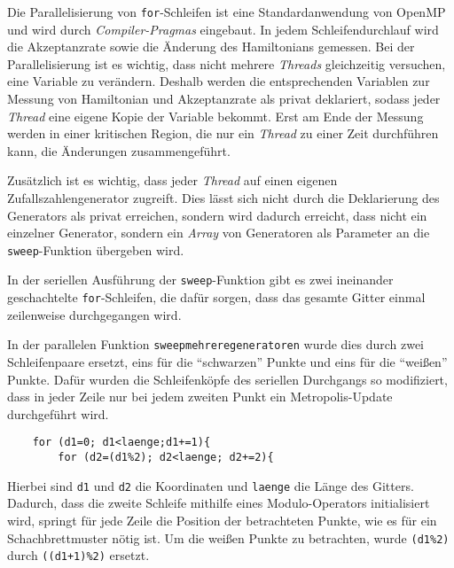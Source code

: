 	Die Parallelisierung von \texttt{for}-Schleifen ist eine Standardanwendung von OpenMP und wird durch \textit{Compiler-Pragmas} eingebaut. In jedem Schleifendurchlauf wird die Akzeptanzrate sowie die Änderung des Hamiltonians gemessen. Bei der Parallelisierung ist es wichtig, dass nicht mehrere \textit{Threads} gleichzeitig versuchen, eine Variable zu verändern. Deshalb werden die entsprechenden Variablen zur Messung von Hamiltonian und Akzeptanzrate als privat deklariert, sodass jeder \textit{Thread} eine eigene Kopie der Variable bekommt. Erst am Ende der Messung werden in einer kritischen Region, die nur ein \textit{Thread} zu einer Zeit durchführen kann, die Änderungen zusammengeführt. 	%
	
	
	Zusätzlich ist es wichtig, dass jeder \textit{Thread} auf einen eigenen Zufallszahlengenerator zugreift. Dies lässt sich nicht durch die Deklarierung des Generators als privat erreichen, sondern wird dadurch erreicht, dass nicht ein einzelner Generator, sondern ein \textit{Array} von Generatoren als Parameter an die \texttt{sweep}-Funktion übergeben wird.
	
	In der seriellen Ausführung der \texttt{sweep}-Funktion gibt es zwei ineinander geschachtelte \texttt{for}-Schleifen, die dafür sorgen, dass das gesamte Gitter einmal zeilenweise durchgegangen wird.
	
	In der parallelen Funktion \texttt{sweepmehreregeneratoren} wurde dies durch zwei Schleifenpaare ersetzt, eins für die \enquote{schwarzen} Punkte und eins für die \enquote{weißen} Punkte.
	Dafür wurden die Schleifenköpfe des seriellen Durchgangs so modifiziert, dass in jeder Zeile nur bei jedem zweiten Punkt ein Metropolis-Update durchgeführt wird. 
	\begin{verbatim}
	for (d1=0; d1<laenge;d1+=1){
		for (d2=(d1%2); d2<laenge; d2+=2){
	\end{verbatim}
	Hierbei sind \texttt{d1} und \texttt{d2} die Koordinaten und \texttt{laenge} die Länge des Gitters. Dadurch, dass die zweite Schleife mithilfe eines Modulo-Operators initialisiert wird, springt für jede Zeile die Position der betrachteten Punkte, wie es für ein Schachbrettmuster nötig ist. Um die weißen Punkte zu betrachten, wurde \texttt{(d1\%2)} durch \texttt{((d1+1)\%2)} ersetzt.
	
